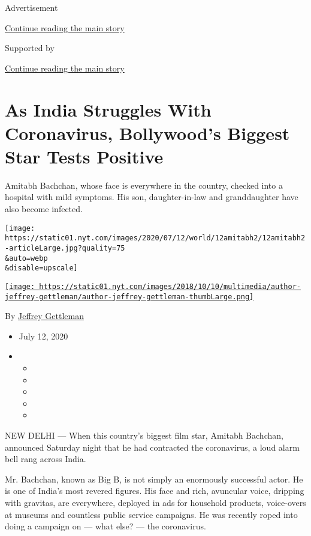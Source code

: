 Advertisement

\protect\hyperlink{after-top}{Continue reading the main story}

Supported by

\protect\hyperlink{after-sponsor}{Continue reading the main story}

\hypertarget{as-india-struggles-with-coronavirus-bollywoods-biggest-star-tests-positive}{%
\section{As India Struggles With Coronavirus, Bollywood's Biggest Star
Tests
Positive}\label{as-india-struggles-with-coronavirus-bollywoods-biggest-star-tests-positive}}

Amitabh Bachchan, whose face is everywhere in the country, checked into
a hospital with mild symptoms. His son, daughter-in-law and
granddaughter have also become infected.

\texttt{[image: https://static01.nyt.com/images/2020/07/12/world/12amitabh2/12amitabh2-articleLarge.jpg?quality=75\\\&auto=webp\\\&disable=upscale]}

\href{https://www.nytimes.com/by/jeffrey-gettleman}{\texttt{[image: https://static01.nyt.com/images/2018/10/10/multimedia/author-jeffrey-gettleman/author-jeffrey-gettleman-thumbLarge.png]}}

By \href{https://www.nytimes.com/by/jeffrey-gettleman}{Jeffrey
Gettleman}

\begin{itemize}
\item
  July 12, 2020
\item
  \begin{itemize}
  \item
  \item
  \item
  \item
  \item
  \end{itemize}
\end{itemize}

NEW DELHI --- When this country's biggest film star, Amitabh Bachchan,
announced Saturday night that he had contracted the coronavirus, a loud
alarm bell rang across India.

Mr. Bachchan, known as Big B, is not simply an enormously successful
actor. He is one of India's most revered figures. His face and rich,
avuncular voice, dripping with gravitas, are everywhere, deployed in ads
for household products, voice-overs at museums and countless public
service campaigns. He was recently roped into doing a campaign on ---
what else? --- the coronavirus.

